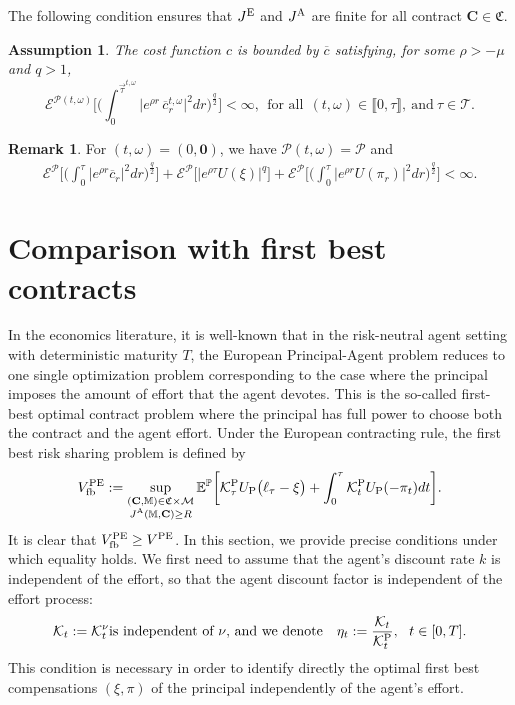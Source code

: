 \documentclass[11pt,a4paper]{article}
\numberwithin{equation}{section}
\def\dbE{\mathbb{E}}
\def\dbM{\mathbb{M}}
\def\dbP{\mathbb{P}}
\newcommand{\cE}{\mathcal{E}}
\newcommand{\cK}{\mathcal{K}}
\newcommand{\cM}{\mathcal{M}}
\newcommand{\cP}{\mathcal{P}}
\newcommand{\cT}{\mathcal{T}}
\newcommand{\Cbf}{\mathbf{C}}
\newcommand{\frakC}{\mathfrak{C}}
\def\om{\omega}
\newcommand{\bea}{\begin{eqnarray}}
\newcommand{\eea}{\end{eqnarray}}
\newcommand{\beaa}{\begin{eqnarray*}}
\newcommand{\eeaa}{\end{eqnarray*}}
\newtheorem{assumption}[theorem]{Assumption}
\theoremstyle{definition}
\newtheorem{remark}[theorem]{Remark}
\begin{document}
The following condition ensures that $J^{\rm E}$ and $J^{\rm A}$ are finite for all contract $\Cbf\in\frakC$.

\begin{assumption} \label{assum:costc}
The cost function $c$ is bounded by $\overline c$ satisfying, for some $\rho>-\mu$ and $q>1$,
 \begin{equation} \label{eq:costc}
  \cE^{\cP(t,\omega)}\bigg[\bigg(\int_0^{\vec{\tau}^{t,\om}} 
                                                 \big|e^{\rho r}\,\overline c_r^{t,\omega}\big|^2 dr
                                         \bigg)^{\frac{q}{2}}\bigg] 
    < \infty,
  ~~\mbox{for all}~~(t,\omega)\in\llbracket 0,\tau\rrbracket,~\mbox{and}~\tau\in\cT.
 \end{equation}
\end{assumption}

\begin{remark}
 For $(t,\omega)=(0,\mathbf{0})$, we have $\cP(t,\omega)=\cP$ and 
  \beaa
     \cE^{\cP}\bigg[\bigg(\int_0^{\tau} \big|e^{\rho r}\overline c_r\big|^2 dr\bigg)^{\frac{q}{2}}\bigg] 
     + \cE^{\cP}\big[|e^{\rho\tau}U(\xi)|^q\big] 
     + \cE^{\cP}\bigg[\bigg(\int_0^\tau |e^{\rho r}U(\pi_r)|^2 dr\bigg)^{\frac{q}{2}}\bigg]
     < \infty.
  \eeaa
\end{remark}

\section{Comparison with first best contracts}
\label{sec:firstbest}


In the economics literature, it is well-known that in the risk-neutral agent setting with deterministic maturity $T$, the European Principal-Agent problem reduces to one single optimization problem corresponding to the case where the principal imposes the amount of effort that the agent devotes. 
This is the so-called first-best optimal contract problem where the principal has full power to choose both the contract and the agent effort. 
Under the European contracting rule, the first best risk sharing problem is defined by
 \bea
 V^{\rm PE}_{\rm fb} 
  :=
 \sup_{\substack{(\Cbf,\dbM)\in\mathfrak{C}\times\cM \\ J^{\rm A}(\dbM,\Cbf)\geq R}}
                                           \dbE^{\dbP}\bigg[\cK^{\rm P}_\tau U_{\rm P}\big(\ell_\tau-\xi\big) 
                                           + \int_0^\tau \cK^{\rm P}_tU_{\rm P}(-\pi_t) dt\bigg].
 \eea
It is clear that $V^{\rm PE}_{\rm fb}\ge V^{\rm PE}$. In this section, we provide precise conditions under which equality holds. We first need to assume that the agent's discount rate $k$ is independent of the effort, so that the agent discount factor is independent of the effort process: 
 \bea\label{eta}
  \cK_t:=\cK^\nu_t
    &\mbox{is independent of $\nu$, and we denote}&
        \eta_t:=\frac{\cK_t}{\cK^{\rm P}_t},
           ~~t\in [0,T].
 \eea
This condition is necessary in order to identify directly the optimal first best compensations $(\xi,\pi)$ of the principal independently of the agent's effort.
\end{document}

